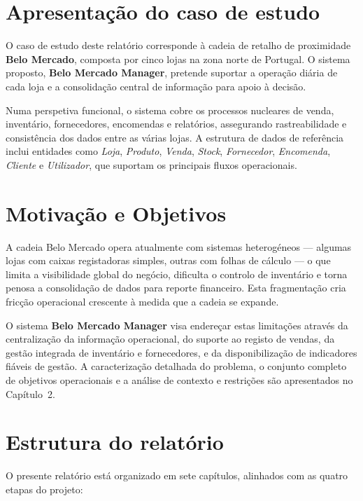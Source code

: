 \section{Apresentação do caso de estudo}

O caso de estudo deste relatório corresponde à cadeia de retalho de proximidade \textbf{Belo Mercado}, composta por cinco lojas na zona norte de Portugal. O sistema proposto, \textbf{Belo Mercado Manager}, pretende suportar a operação diária de cada loja e a consolidação central de informação para apoio à decisão.

Numa perspetiva funcional, o sistema cobre os processos nucleares de venda, inventário, fornecedores, encomendas e relatórios, assegurando rastreabilidade e consistência dos dados entre as várias lojas. A estrutura de dados de referência inclui entidades como \textit{Loja}, \textit{Produto}, \textit{Venda}, \textit{Stock}, \textit{Fornecedor}, \textit{Encomenda}, \textit{Cliente} e \textit{Utilizador}, que suportam os principais fluxos operacionais.

\section{Motivação e Objetivos}

A cadeia Belo Mercado opera atualmente com sistemas heterogéneos --- algumas lojas com caixas registadoras simples, outras com folhas de cálculo --- o que limita a visibilidade global do negócio, dificulta o controlo de inventário e torna penosa a consolidação de dados para reporte financeiro. Esta fragmentação cria fricção operacional crescente à medida que a cadeia se expande.

O sistema \textbf{Belo Mercado Manager} visa endereçar estas limitações através da centralização da informação operacional, do suporte ao registo de vendas, da gestão integrada de inventário e fornecedores, e da disponibilização de indicadores fiáveis de gestão. A caracterização detalhada do problema, o conjunto completo de objetivos operacionais e a análise de contexto e restrições são apresentados no Capítulo~2.

\section{Estrutura do relatório}
    O presente relatório está organizado em sete capítulos, alinhados com as quatro etapas do projeto:

